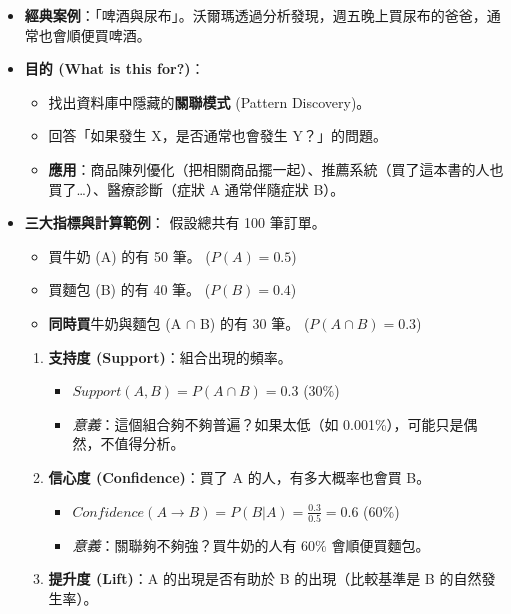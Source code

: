 \documentclass[
  letterpaper,
  DIV=11,
  numbers=noendperiod]{scrreprt}
\providecommand{\tightlist}{%
  \setlength{\itemsep}{0pt}\setlength{\parskip}{0pt}}
\begin{document}
\begin{itemize}
\tightlist
\item
  \textbf{經典案例}：「啤酒與尿布」。沃爾瑪透過分析發現，週五晚上買尿布的爸爸，通常也會順便買啤酒。
\item
  \textbf{目的 (What is this for?)}：

  \begin{itemize}
  \tightlist
  \item
    找出資料庫中隱藏的\textbf{關聯模式} (Pattern Discovery)。
  \item
    回答「如果發生 X，是否通常也會發生 Y？」的問題。
  \item
    \textbf{應用}：商品陳列優化（把相關商品擺一起）、推薦系統（買了這本書的人也買了\ldots）、醫療診斷（症狀
    A 通常伴隨症狀 B）。
  \end{itemize}
\item
  \textbf{三大指標與計算範例}： 假設總共有 100 筆訂單。

  \begin{itemize}
  \tightlist
  \item
    買牛奶 (A) 的有 50 筆。 (\(P(A) = 0.5\))
  \item
    買麵包 (B) 的有 40 筆。 (\(P(B) = 0.4\))
  \item
    \textbf{同時買}牛奶與麵包 (A \(\cap\) B) 的有 30 筆。
    (\(P(A \cap B) = 0.3\))
  \end{itemize}

  \begin{enumerate}
  \def\labelenumi{\arabic{enumi}.}
  \tightlist
  \item
    \textbf{支持度 (Support)}：組合出現的頻率。

    \begin{itemize}
    \tightlist
    \item
      \(Support(A, B) = P(A \cap B) = \mathbf{0.3}\) (30\%)
    \item
      \emph{意義}：這個組合夠不夠普遍？如果太低（如
      0.001\%），可能只是偶然，不值得分析。
    \end{itemize}
  \item
    \textbf{信心度 (Confidence)}：買了 A 的人，有多大概率也會買 B。

    \begin{itemize}
    \tightlist
    \item
      \(Confidence(A \to B) = P(B|A) = \frac{0.3}{0.5} = \mathbf{0.6}\)
      (60\%)
    \item
      \emph{意義}：關聯夠不夠強？買牛奶的人有 60\% 會順便買麵包。
    \end{itemize}
  \item
    \textbf{提升度 (Lift)}：A 的出現是否有助於 B 的出現（比較基準是 B
    的自然發生率）。


\end{enumerate}
\end{itemize}
\end{document}
